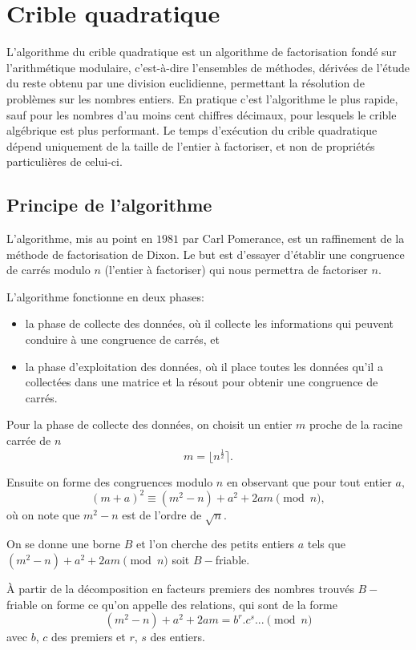 \documentclass[french, 12pt, titlepage]{article}
\newenvironment{itemH}[0]{\begin{itemize}[label=$\bullet$, font=\color{black} \large]}{\end{itemize}}
\begin{document}
\section{Crible quadratique}

L'algorithme du crible quadratique est un algorithme de factorisation fondé sur l'arithmétique modulaire, c'est-à-dire l'ensembles de méthodes, dérivées de l'étude du reste obtenu par une division euclidienne, permettant la résolution de problèmes sur les nombres entiers. En pratique c'est l'algorithme le plus rapide, sauf pour les nombres d'au moins cent chiffres décimaux, pour lesquels le crible algébrique est plus performant.
Le temps d'exécution du crible quadratique dépend uniquement de la taille de l'entier à factoriser, et non de propriétés particulières de celui-ci.

\subsection{Principe de l'algorithme}

L'algorithme, mis au point en $1981$ par Carl Pomerance, est un raffinement de la méthode de factorisation de Dixon. Le but est d'essayer d'établir une congruence de carrés modulo $n$ (l'entier à factoriser) qui nous permettra de factoriser $n.$

L'algorithme fonctionne en deux phases:
\begin{itemH}
\item la phase de collecte des données, où il collecte les informations qui peuvent conduire à une congruence de carrés, et
\item la phase d'exploitation des données, où il place toutes les données qu'il a collectées dans une matrice et la résout pour obtenir une congruence de carrés.
\end{itemH}

Pour la phase de collecte des données, on choisit un entier $m$ proche de la racine carrée de $n$ \[ m = \lfloor n^{\frac{1}{2}} \rceil .\]

Ensuite on forme des congruences modulo $n$ en observant que pour tout entier $a,$ \[ (m + a)^2 \equiv (m^2 - n) + a^2 + 2am \pmod n , \] où on note que $m^2 - n$ est de l'ordre de $\sqrt{n}.$

On se donne une borne $B$ et l'on cherche des petits entiers $a$ tels que $(m^2 - n) + a^2 + 2am \pmod n$ soit $B-$friable.

{\`A} partir de la décomposition en facteurs premiers des nombres trouvés $B-$friable on forme ce qu'on appelle des relations, qui sont de la forme \[(m^2 - n) + a^2 + 2am = b^r.c^s... \pmod n\] avec $b$, $c$ des premiers et $r$, $s$ des entiers.
\end{document}
